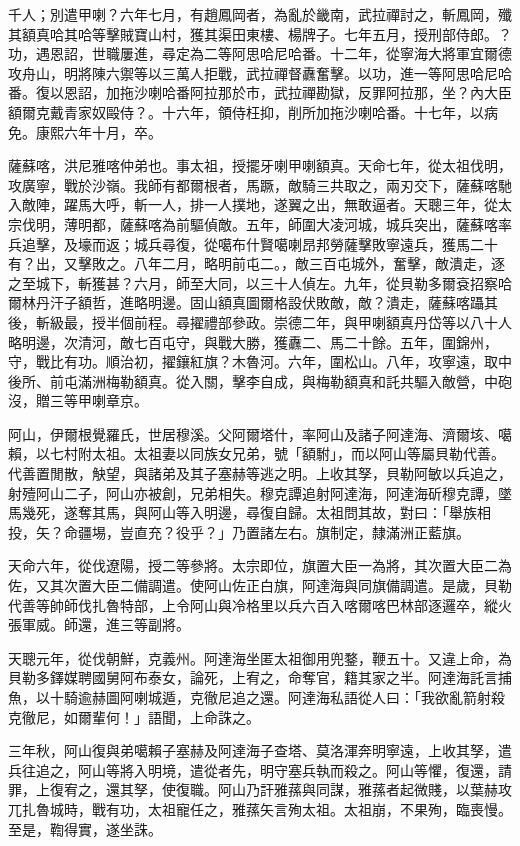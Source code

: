 \begin{pinyinscope}
千人；別遣甲喇？六年七月，有趙鳳岡者，為亂於畿南，武拉禪討之，斬鳳岡，殲其額真哈其哈等擊賊寶山村，獲其渠田東樓、楊牌子。七年五月，授刑部侍郎。？功，遇恩詔，世職屢進，尋定為二等阿思哈尼哈番。十二年，從寧海大將軍宜爾德攻舟山，明將陳六禦等以三萬人拒戰，武拉禪督纛奮擊。以功，進一等阿思哈尼哈番。復以恩詔，加拖沙喇哈番阿拉那於市，武拉禪勘獄，反罪阿拉那，坐？內大臣額爾克戴青家奴毆侍？。十六年，領侍枉抑，削所加拖沙喇哈番。十七年，以病免。康熙六年十月，卒。

薩蘇喀，洪尼雅喀仲弟也。事太祖，授擺牙喇甲喇額真。天命七年，從太祖伐明，攻廣寧，戰於沙嶺。我師有都爾根者，馬蹶，敵騎三共取之，兩刃交下，薩蘇喀馳入敵陣，躍馬大呼，斬一人，排一人撲地，遂翼之出，無敢逼者。天聰三年，從太宗伐明，薄明都，薩蘇喀為前驅偵敵。五年，師圍大凌河城，城兵突出，薩蘇喀率兵追擊，及壕而返；城兵尋復，從噶布什賢噶喇昂邦勞薩擊敗寧遠兵，獲馬二十有？出，又擊敗之。八年二月，略明前屯二。，敵三百屯城外，奮擊，敵潰走，逐之至城下，斬獲甚？六月，師至大同，以三十人偵左。九年，從貝勒多爾袞招察哈爾林丹汗子額哲，進略明邊。固山額真圖爾格設伏敗敵，敵？潰走，薩蘇喀躡其後，斬級最，授半個前程。尋擢禮部參政。崇德二年，與甲喇額真丹岱等以八十人略明邊，次清河，敵七百屯守，與戰大勝，獲纛二、馬二十餘。五年，圍錦州，守，戰比有功。順治初，擢鑲紅旗？木魯河。六年，圍松山。八年，攻寧遠，取中後所、前屯滿洲梅勒額真。從入關，擊李自成，與梅勒額真和託共驅入敵營，中砲沒，贈三等甲喇章京。

阿山，伊爾根覺羅氏，世居穆溪。父阿爾塔什，率阿山及諸子阿達海、濟爾垓、噶賴，以七村附太祖。太祖妻以同族女兄弟，號「額駙」，而以阿山等屬貝勒代善。代善置閒散，觖望，與諸弟及其子塞赫等逃之明。上收其孥，貝勒阿敏以兵追之，射殪阿山二子，阿山亦被創，兄弟相失。穆克譚追射阿達海，阿達海斫穆克譚，墜馬幾死，遂奪其馬，與阿山等入明邊，尋復自歸。太祖問其故，對曰：「舉族相投，矢？命疆埸，豈直充？役乎？」乃置諸左右。旗制定，隸滿洲正藍旗。

天命六年，從伐遼陽，授二等參將。太宗即位，旗置大臣一為將，其次置大臣二為佐，又其次置大臣二備調遣。使阿山佐正白旗，阿達海與同旗備調遣。是歲，貝勒代善等帥師伐扎魯特部，上令阿山與冷格里以兵六百入喀爾喀巴林部逐邏卒，縱火張軍威。師還，進三等副將。

天聰元年，從伐朝鮮，克義州。阿達海坐匿太祖御用兜鍪，鞭五十。又違上命，為貝勒多鐸媒聘國舅阿布泰女，論死，上宥之，命奪官，籍其家之半。阿達海託言捕魚，以十騎逾赫圖阿喇城遁，克徹尼追之還。阿達海私語從人曰：「我欲亂箭射殺克徹尼，如爾輩何！」語聞，上命誅之。

三年秋，阿山復與弟噶賴子塞赫及阿達海子查塔、莫洛渾奔明寧遠，上收其孥，遣兵往追之，阿山等將入明境，遣從者先，明守塞兵執而殺之。阿山等懼，復還，請罪，上復宥之，還其孥，使復職。阿山乃訐雅蓀與同謀，雅蓀者起微賤，以葉赫攻兀扎魯城時，戰有功，太祖寵任之，雅蓀矢言殉太祖。太祖崩，不果殉，臨喪慢。至是，鞫得實，遂坐誅。


\end{pinyinscope}
